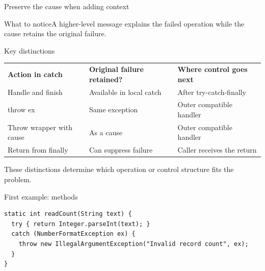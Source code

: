 \documentclass[10pt,aspectratio=169]{beamer}
\begin{document}
\begin{frame}[fragile,t]{Preserve the cause when adding context}
\begin{center}\end{center}
\begin{block}{What to notice}A higher-level message explains the failed operation while the cause retains the original failure.\end{block}
\end{frame}
\begin{frame}[fragile,t]{Key distinctions}
\small\renewcommand{\arraystretch}{1.5}
\begin{tabularx}{\textwidth}{>{\raggedright\arraybackslash}X>{\raggedright\arraybackslash}X>{\raggedright\arraybackslash}X}
\rowcolor{navy}
\color{white}\bfseries Action in catch & \color{white}\bfseries Original failure retained? & \color{white}\bfseries Where control goes next\\
Handle and finish & Available in local catch & After try-catch-finally\\
throw ex & Same exception & Outer compatible handler\\
Throw wrapper with cause & As a cause & Outer compatible handler\\
Return from finally & Can suppress failure & Caller receives the return\\
\end{tabularx}
\vspace{3mm}\footnotesize These distinctions determine which operation or control structure fits the problem.
\end{frame}

\begin{frame}[fragile,t]{First example: methods}
\begin{lstlisting}
static int readCount(String text) {
  try { return Integer.parseInt(text); }
  catch (NumberFormatException ex) {
    throw new IllegalArgumentException("Invalid record count", ex);
  }
}
\end{lstlisting}
\end{frame}
\end{document}

